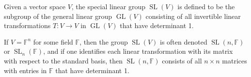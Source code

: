 \documentclass{article}
\newcommand{\SL}{{\operatorname{SL}}}
\begin{document}
Given a vector space $V$, the special linear group $\SL(V)$ is defined to be the subgroup of the general linear group $\operatorname{GL}(V)$ consisting of all invertible linear transformations $T: V \longrightarrow V$ in $\operatorname{GL}(V)$ that have determinant 1.

If $V = \mathbb{F}^n$ for some field $\mathbb{F}$, then the group $\SL(V)$ is often denoted $\SL(n,\mathbb{F})$ or $\SL_n(\mathbb{F})$, and if one identifies each linear transformation with its matrix with respect to the standard basis, then $\SL(n,\mathbb{F})$ consists of all $n \times n$ matrices with entries in $\mathbb{F}$ that have determinant 1.
\end{document}
